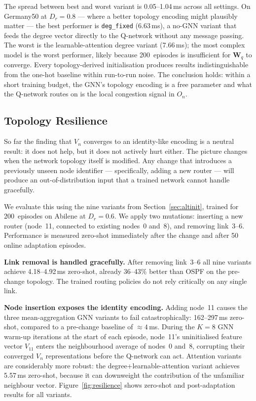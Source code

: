 \documentclass[10pt,twocolumn,letterpaper]{article}
\begin{document}
The spread between best and worst variant is 0.05--1.04\,ms across all
settings. On Germany50 at $D_r = 0.8$ --- where a better topology
encoding might plausibly matter --- the best performer is
\texttt{deg\_fixed} (6.63\,ms), a no-GNN variant that feeds the degree
vector directly to the Q-network without any message passing. The worst
is the learnable-attention degree variant (7.66\,ms); the most complex
model is the worst performer, likely because 200~episodes is
insufficient for $\mathbf{W}_q$ to converge. Every topology-derived
initialisation produces results indistinguishable from the one-hot
baseline within run-to-run noise. The conclusion holds: within a
short training budget, the GNN's topology encoding is a free parameter
and what the Q-network routes on is the local congestion signal in $O_n$.

\subsection{Topology Resilience}
\label{sec:resilience}

So far the finding that $V_n$ converges to an identity-like encoding is
a neutral result: it does not help, but it does not actively hurt
either. The picture changes when the network topology itself is
modified. Any change that introduces a previously unseen node identifier
--- specifically, adding a new router --- will produce an
out-of-distribution input that a trained network cannot handle
gracefully.

We evaluate this using the nine variants from
Section~\ref{sec:altinit}, trained for 200~episodes on Abilene at
$D_r = 0.6$. We apply two mutations: inserting a new router (node~11,
connected to existing nodes~0 and~8), and removing link~3--6.
Performance is measured zero-shot immediately after the change and
after 50 online adaptation episodes.

\textbf{Link removal is handled gracefully.} After removing link~3--6
all nine variants achieve 4.18--4.92\,ms zero-shot, already 36--43\%
better than OSPF on the pre-change topology. The trained routing
policies do not rely critically on any single link.

\textbf{Node insertion exposes the identity encoding.} Adding node~11
causes the three mean-aggregation GNN variants to fail
catastrophically: 162--297\,ms zero-shot, compared to a pre-change
baseline of $\approx 4$\,ms. During the $K = 8$ GNN warm-up iterations
at the start of each episode, node~11's uninitialised feature vector
$V_{11}$ enters the neighbourhood average of nodes~0 and~8, corrupting
their converged $V_n$ representations before the Q-network can act.
Attention variants are considerably more robust: the
degree+learnable-attention variant achieves 5.57\,ms zero-shot, because
it can downweight the contribution of the unfamiliar neighbour vector.
Figure~\ref{fig:resilience} shows zero-shot and post-adaptation results
for all variants.
\end{document}
